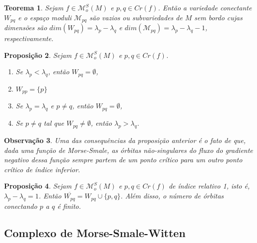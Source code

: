 \documentclass[12pt]{book}
\newtheorem{teorema}{Teorema}[section]
\newtheorem{observacao}[teorema]{Observação}
\newtheorem{proposicao}[teorema]{Proposição}
\newcommand{\espacomoduli}[2]{\mathcal{M}_{#1#2}}
\newcommand{\funcoesmorsesmale}[1]{\mathcal{M}^{S}_{o}(#1)}
\newcommand{\pontoscriticos}[1]{\textit{Cr}(#1)}
\newcommand{\variedadeconectantepontos}[2]{W_{#1#2}}
\begin{document}
	 \begin{teorema}
	 	Sejam $f\in \funcoesmorsesmale{M}$ e $p,q \in \pontoscriticos{f}$. Então a variedade conectante $\variedadeconectantepontos{p}{q}$ e o espaço moduli $\espacomoduli{p}{q}$ são vazios ou subvariedades de $M$ sem bordo cujas dimensões são $dim(\variedadeconectantepontos{p}{q}) = \lambda_{p} -\lambda_{q}$ e $dim(\espacomoduli{p}{q}) = \lambda_{p} -\lambda_{q}-1$, respectivamente. 
	 \end{teorema}
	 
	 \begin{proposicao}
	 	Sejam $f \in \funcoesmorsesmale{M}$ e $p,q \in \pontoscriticos{f}$.
	 	\begin{enumerate}
	 		\item Se $\lambda_{p}<\lambda_{q}$, então $\variedadeconectantepontos{p}{q} = \emptyset$,
	 		
	 		\item $\variedadeconectantepontos{p}{p} = \{p\}$
	 		
	 		\item Se $\lambda_{p} = \lambda_{q}$ e $p\neq q$, então $\variedadeconectantepontos{p}{q} = \emptyset$,
	 		
	 		\item Se $p \neq q$ tal que $\variedadeconectantepontos{p}{q} \neq \emptyset$, então $\lambda_{p}>\lambda_{q}$.
	 	\end{enumerate}
	 \end{proposicao}

	\begin{observacao}
		Uma das consequências da proposição anterior é o fato de que, dada uma função de Morse-Smale, as órbitas não-singulares do fluxo do gradiente negativo dessa função sempre partem de um ponto crítico para um outro ponto crítico de índice inferior.
	\end{observacao}
	
	\begin{proposicao}
		Sejam $f \in \funcoesmorsesmale{M}$ e $p,q \in \pontoscriticos{f}$ de índice relativo 1, isto é, $\lambda_{p} - \lambda_{q} = 1$. Então $\overline{\variedadeconectantepontos{p}{q}} = \variedadeconectantepontos{p}{q} \cup \{p,q\}$. Além disso, o número de órbitas conectando $p$ a $q$ é finito.
	\end{proposicao}

	\subsection{Complexo de Morse-Smale-Witten}
	
\end{document}
